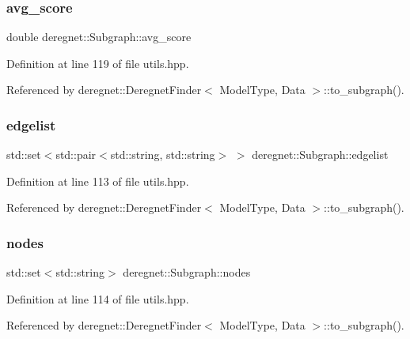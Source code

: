 \subsubsection{\texorpdfstring{avg\+\_\+score}{avg\_score}}
{\footnotesize\ttfamily double deregnet\+::\+Subgraph\+::avg\+\_\+score}



Definition at line 119 of file utils.\+hpp.



Referenced by deregnet\+::\+Deregnet\+Finder$<$ Model\+Type, Data $>$\+::to\+\_\+subgraph().

\mbox{\label{structderegnet_1_1Subgraph_a918a816236f30355b2ec812af629db09}} 
\subsubsection{\texorpdfstring{edgelist}{edgelist}}
{\footnotesize\ttfamily std\+::set$<$std\+::pair$<$std\+::string, std\+::string$>$ $>$ deregnet\+::\+Subgraph\+::edgelist}



Definition at line 113 of file utils.\+hpp.



Referenced by deregnet\+::\+Deregnet\+Finder$<$ Model\+Type, Data $>$\+::to\+\_\+subgraph().

\mbox{\label{structderegnet_1_1Subgraph_a6f8b8d288c1314cc9623e732c5b89056}} 
\subsubsection{\texorpdfstring{nodes}{nodes}}
{\footnotesize\ttfamily std\+::set$<$std\+::string$>$ deregnet\+::\+Subgraph\+::nodes}



Definition at line 114 of file utils.\+hpp.



Referenced by deregnet\+::\+Deregnet\+Finder$<$ Model\+Type, Data $>$\+::to\+\_\+subgraph().

\mbox{\label{structderegnet_1_1Subgraph_a2a818ffe02ceced905ef38cb9a5253df}} 

